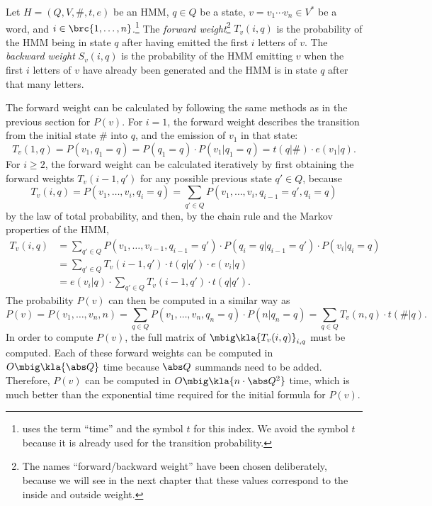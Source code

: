 \begin{definition}
 Let $H=(Q,V,\#,t,e)$ be an HMM, $q\in Q$ be a state, $v=v_1\cdots v_n\in V^*$
 be a word, and $i\in\brc{1,\ldots,n}$.\footnote{\cite{vogler2015} uses the
 term ``time'' and the symbol $t$ for this index. We avoid the symbol $t$
 because it is already used for the transition probability.} The \emph{forward
 weight}\footnote{The names ``forward/backward weight'' have been chosen
 deliberately, because we will see in the next chapter that these values
 correspond to the inside and outside weight.} $T_v(i,q)$ is the probability
 of the HMM being in state $q$ after having emitted the first $i$ letters of
 $v$. The \emph{backward weight} $S_v(i,q)$ is the probability of the HMM
 emitting $v$ when the first $i$ letters of $v$ have already been generated and
 the HMM is in state $q$ after that many letters.
\end{definition}

The forward weight can be calculated by following the same methods as in the
previous section for $P(v)$. For $i = 1$, the forward weight describes the
transition from the initial state $\#$ into $q$, and the emission of $v_1$ in
that state:
\[
 T_v(1,q) = P(v_1,q_1=q) = P(q_1=q) \cdot P(v_1|q_1=q) = t(q|\#) \cdot e(v_1|q).
\]
For $i\geq 2$, the forward weight can be calculated iteratively by first
obtaining the forward weights $T_v(i-1,q')$ for any possible previous state
$q'\in Q$, because
\[
 T_v(i,q) = P(v_1,\ldots,v_i,q_i=q) = \sum_{q'\in Q} P(v_1,\ldots,v_i,q_{i-1}=q',q_i=q)
\]
by the law of total probability, and then, by the chain rule and the Markov
properties of the HMM,
\begin{align*}
 T_v(i,q)
  &= \sum_{q'\in Q} P(v_1,\ldots,v_{i-1},q_{i-1}=q') \cdot P(q_i=q|q_{i-1}=q') \cdot P(v_i|q_i=q) \\
  &= \sum_{q'\in Q} T_v(i-1,q') \cdot t(q|q') \cdot e(v_i|q) \\
  &= e(v_i|q) \cdot \sum_{q'\in Q} T_v(i-1,q') \cdot t(q|q').
\end{align*}
The probability $P(v)$ can then be computed in a similar way as
\[
 P(v) = P(v_1,\ldots,v_n,n) = \sum_{q\in Q} P(v_1,\ldots,v_n,q_n=q) \cdot P(n|q_n=q) = \sum_{q\in Q} T_v(n,q) \cdot t(\#|q).
\]
In order to compute $P(v)$, the full matrix of $\mbig\kla{T_v(i,q)}_{i,q}$ must
be computed. Each of these forward weights can be computed in $O\mbig\kla{\abs
Q}$ time because $\abs Q$ summands need to be added. Therefore, $P(v)$ can be
computed in $O\mbig\kla{n \cdot \abs Q^2}$ time, which is much better than the
exponential time required for the initial formula for $P(v)$.

